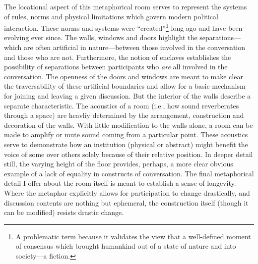 \documentclass{article}
\begin{document}
The locational aspect of this metaphorical room serves to represent the systems of rules, norms and physical limitations which govern modern political interaction.
These norms and systems were ``created''\footnote{A problematic term because it validates the view that a well-defined moment of consensus which brought humankind out of a state of nature and into society---a fiction.} long ago and have been evolving ever since.
The walls, windows and doors highlight the separations---which are often artificial in nature---between those involved in the conversation and those who are not.
Furthermore, the notion of enclaves establishes the possibility of separations between participants who \emph{are} all involved in the conversation.
The openness of the doors and windows are meant to make clear the traversability of these artificial boundaries and allow for a basic mechanism for joining and leaving a given discussion.
But the interior of the walls describe a separate characteristic.
The acoustics of a room (i.e., how sound reverberates through a space) are heavliy determined by the arrangement, construction and decoration of the walls.
With little modification to the walls alone, a room can be made to amplify or mute sound coming from a particular point.
These acoustics serve to demonstrate how an institution (physical or abstract) might benefit the voice of some over others solely because of their relative position.
In deeper detail still, the varying height of the floor provides, perhaps, a more clear obvious example of a lack of equality in constructs of conversation.
The final metaphorical detail I offer about the room itself is meant to establish a sense of longevity.
Where the metaphor explicitly allows for participation to change drastically, and discussion contents are nothing but ephemeral, the construction itself (though it can be modified) resists drastic change.
\end{document}
